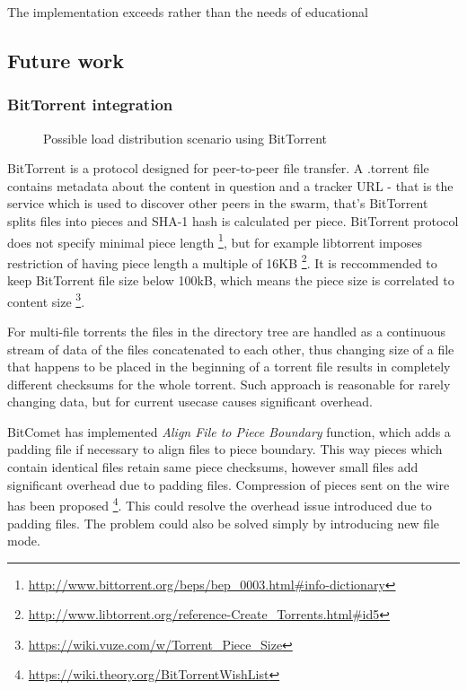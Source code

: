 \documentclass{article}
\begin{document}
The implementation exceeds rather than  the needs of educational 



\subsection{Future work}

\subsubsection{BitTorrent integration}


\begin{figure}[!htb]
\centering
\scalebox{0.5}{}
\caption{Possible load distribution scenario using BitTorrent}
\label{fig:butterknife-usecase-bittorrent}
\end{figure}

BitTorrent is a protocol designed for peer-to-peer file transfer.
A .torrent file contains metadata about the content in question and a
tracker URL - that is the service which is used to discover other peers in the swarm, that's 
BitTorrent splits files into pieces and SHA-1 hash is calculated per piece.
BitTorrent protocol does not specify minimal piece length
\footnote{\url{http://www.bittorrent.org/beps/bep_0003.html#info-dictionary}},
but for example libtorrent imposes restriction of having piece length
a multiple of 16KB
\footnote{\url{http://www.libtorrent.org/reference-Create_Torrents.html#id5}}.
It is reccommended to keep BitTorrent file size below 100kB,
which means the piece size is correlated to content size
\footnote{\url{https://wiki.vuze.com/w/Torrent_Piece_Size}}.

For multi-file torrents the files in the directory tree are handled
as a continuous stream of data of the files concatenated to each other,
thus changing size of a file that happens to be placed in the beginning of a torrent
file results in completely different checksums for the whole torrent.
Such approach is reasonable for rarely changing data, but for current usecase
causes significant overhead.

BitComet has implemented \emph{Align File to Piece Boundary} function,
which adds a padding file if necessary to align files to piece boundary.
This way pieces which contain identical files retain same piece checksums,
however small files add significant overhead due to padding files.
Compression of pieces sent on the wire has been proposed
\footnote{\url{https://wiki.theory.org/BitTorrentWishList}}.
This could resolve the overhead issue introduced due to padding files.
The problem could also be solved simply by introducing new file mode.
\end{document}
